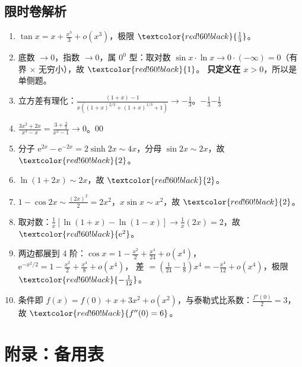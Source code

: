 \documentclass[11pt,a4paper]{ctexart}
\newcommand{\ee}{\mathrm{e}}
\newcommand{\ans}[1]{\ifmmode\textcolor{red!60!black}{#1}\else\textbf{\textcolor{red!60!black}{#1}}\fi}
\begin{document}
\subsection{限时卷解析}

\begin{enumerate}[label=\textbf{L\arabic*.},start=1]
  \item $\tan x=x+\frac{x^{3}}3+o(x^{3})$，极限 $\ans{\frac13}$。
  \item 底数 $\to0$，指数 $\to0$，属 $0^0$ 型：取对数 $\sin x\cdot\ln x\to0\cdot(-\infty)=0$（有界 $\times$ 无穷小），故 $\ans{1}$。
        \textbf{只定义在 $x>0$}，所以是单侧题。
  \item 立方差有理化：$\frac{(1+x)-1}{x\left((1+x)^{2/3}+(1+x)^{1/3}+1\right)}\to-\frac13$。\ans{$-\frac13$}
  \item $\frac{3x^{2}+2x}{x^{3}-x}=\frac{3+\frac2x}{x^{2}-1}\to0$。\ans{$0$}
  \item 分子 $\ee^{2x}-\ee^{-2x}=2\sinh 2x\sim4x$，分母 $\sin2x\sim2x$，故 $\ans{2}$。
  \item $\ln(1+2x)\sim2x$，故 $\ans{2}$。
  \item $1-\cos2x\sim\frac{(2x)^{2}}2=2x^{2}$，$x\sin x\sim x^{2}$，故 $\ans{2}$。
  \item 取对数：$\frac{1}{x}\left[\ln(1+x)-\ln(1-x)\right]\to\frac1x(2x)=2$，故 $\ans{\ee^{2}}$。
  \item 两边都展到 4 阶：$\cos x=1-\frac{x^{2}}2+\frac{x^{4}}{24}+o(x^{4})$，
        $\ee^{-x^{2}/2}=1-\frac{x^{2}}2+\frac{x^{4}}8+o(x^{4})$，
        差 $=\left(\frac1{24}-\frac18\right)x^{4}=-\frac{x^{4}}{12}+o(x^{4})$，极限 $\ans{-\frac1{12}}$。
  \item 条件即 $f(x)=f(0)+x+3x^{2}+o(x^{2})$，与泰勒式比系数：$\frac{f''(0)}2=3$，故 $\ans{f''(0)=6}$。
\end{enumerate}

\appendix
\section{附录：备用表}
\end{document}
